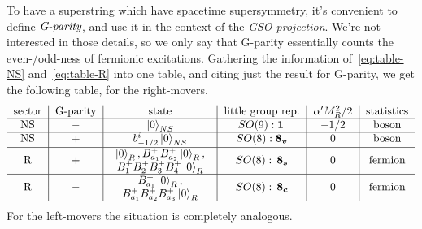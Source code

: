 To have a superstring which have spacetime supersymmetry, it's convenient to define $\emph{G-parity}$, and use it in the context of the \emph{GSO-projection}. We're not interested in those details, so we only say that G-parity essentially counts the even-/odd-ness of fermionic excitations. Gathering the information of~\eqref{eq:table-NS} and~\eqref{eq:table-R} into one table, and citing just the result for G-parity, we get the following table, for the right-movers.
\begin{equation*}
\begin{tabular}{c|c|c|c|c|c}
    sector & G-parity & state & little group rep. & $\alpha' M^2_R /2$ & statistics \\ \hline
        NS & $-$ & $\ket{0}_{NS}$   & $SO(9): \i \,$ & $-1/2$ & boson   \\ \hline
    NS & $+$ & $b^i_{-1/2} \ket{0}_{NS}$   & $SO(8): \v$  & 0 & boson \\ \hline 
        \multirow{2}{*}{R} & \multirow{2}{*}{$+$} & \multirow{2}{*}{$\begin{array}{c} 
            \ket{0}_{R}, B^+_{a_1}B^+_{a_2}\ket{0}_{R}, \\ 
            B^+_{1}B^+_{2}B^+_{3}B^+_{4} \ket{0}_{R} 
        \end{array}$} & \multirow{2}{*}{$SO(8): \, \s$} & \multirow{2}{*}{$0$} & \multirow{2}{*}{fermion} \\ 
        & & & & \\ \hline
        \multirow{2}{*}{R} & \multirow{2}{*}{$-$} & \multirow{2}{*}{$\begin{array}{c} 
            B^+_{a_1} \ket{0}_{R}, \\ 
            B^+_{a_1}B^+_{a_2}B^+_{a_3}\ket{0}_{R}
        \end{array}$} & \multirow{2}{*}{$SO(8): \, \c$} & \multirow{2}{*}{$0$} & \multirow{2}{*}{fermion} \\
        & & & & \\ 
       
\end{tabular}
\end{equation*}
For the left-movers the situation is completely analogous.


